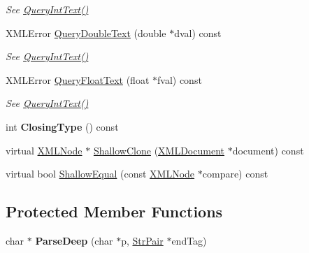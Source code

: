 \begin{DoxyCompactItemize}
\begin{DoxyCompactList}\small\item\em See \hyperlink{classtinyxml2_1_1_x_m_l_element_a71327c9a9d8840562bd204f46d0a7189}{Query\+Int\+Text()} \end{DoxyCompactList}\item 
\hypertarget{classtinyxml2_1_1_x_m_l_element_aad931c42548907dbea416f7365d78b57}{}X\+M\+L\+Error \hyperlink{classtinyxml2_1_1_x_m_l_element_aad931c42548907dbea416f7365d78b57}{Query\+Double\+Text} (double $\ast$dval) const \label{classtinyxml2_1_1_x_m_l_element_aad931c42548907dbea416f7365d78b57}

\begin{DoxyCompactList}\small\item\em See \hyperlink{classtinyxml2_1_1_x_m_l_element_a71327c9a9d8840562bd204f46d0a7189}{Query\+Int\+Text()} \end{DoxyCompactList}\item 
\hypertarget{classtinyxml2_1_1_x_m_l_element_a11fa26e1dbca88e973964c1d9b597658}{}X\+M\+L\+Error \hyperlink{classtinyxml2_1_1_x_m_l_element_a11fa26e1dbca88e973964c1d9b597658}{Query\+Float\+Text} (float $\ast$fval) const \label{classtinyxml2_1_1_x_m_l_element_a11fa26e1dbca88e973964c1d9b597658}

\begin{DoxyCompactList}\small\item\em See \hyperlink{classtinyxml2_1_1_x_m_l_element_a71327c9a9d8840562bd204f46d0a7189}{Query\+Int\+Text()} \end{DoxyCompactList}\item 
\hypertarget{classtinyxml2_1_1_x_m_l_element_a2e3d9f938307a05963d7c4b8cd55754e}{}int {\bfseries Closing\+Type} () const \label{classtinyxml2_1_1_x_m_l_element_a2e3d9f938307a05963d7c4b8cd55754e}

\item 
virtual \hyperlink{classtinyxml2_1_1_x_m_l_node}{X\+M\+L\+Node} $\ast$ \hyperlink{classtinyxml2_1_1_x_m_l_element_a0ab7c8cff5ae8d25b50439ed7bc10eee}{Shallow\+Clone} (\hyperlink{classtinyxml2_1_1_x_m_l_document}{X\+M\+L\+Document} $\ast$document) const 
\item 
virtual bool \hyperlink{classtinyxml2_1_1_x_m_l_element_aba63b0ae2cdd65f30c09ba8ee725c89c}{Shallow\+Equal} (const \hyperlink{classtinyxml2_1_1_x_m_l_node}{X\+M\+L\+Node} $\ast$compare) const 
\end{DoxyCompactItemize}
\subsection*{Protected Member Functions}
\begin{DoxyCompactItemize}
\item 
\hypertarget{classtinyxml2_1_1_x_m_l_element_a4062a36d52a61950768f93f3bb2ee46a}{}char $\ast$ {\bfseries Parse\+Deep} (char $\ast$p, \hyperlink{classtinyxml2_1_1_str_pair}{Str\+Pair} $\ast$end\+Tag)\label{classtinyxml2_1_1_x_m_l_element_a4062a36d52a61950768f93f3bb2ee46a}

\end{DoxyCompactItemize}
